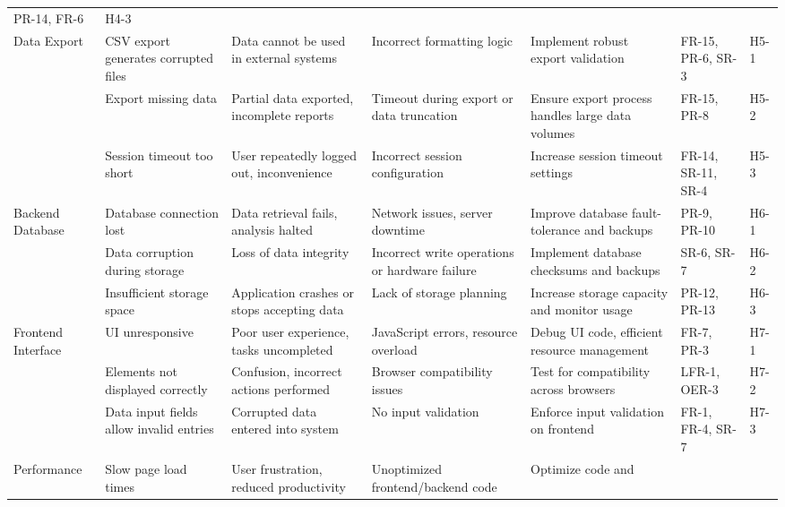 \documentclass{article}
\begin{document}
\begin{landscape}
\begin{longtable}{|p{2.5cm}|p{4cm}|p{4cm}|p{4cm}|p{4cm}|p{1.25cm}|p{1cm}|}
        PR-14, FR-6 & H4-3 \\
        \cline{1-7}
        Data Export & CSV export generates corrupted files & Data cannot be used
        in external systems & Incorrect formatting logic & Implement robust
        export validation & FR-15, PR-6, SR-3 & H5-1 \\
        \cline{2-7}
        \texttt{} & Export missing data & Partial data exported, incomplete
        reports & Timeout during export or data truncation & Ensure export
        process handles large data volumes & FR-15, PR-8 & H5-2 \\
        \cline{2-7}
        \texttt{} & Session timeout too short & User repeatedly logged out,
        inconvenience & Incorrect session configuration & Increase session
        timeout settings & FR-14, SR-11, SR-4 & H5-3 \\
        \cline{1-7}
        Backend Database & Database connection lost & Data retrieval fails,
        analysis halted & Network issues, server downtime & Improve database
        fault-tolerance and backups & PR-9, PR-10 & H6-1 \\
        \cline{2-7}
        \texttt{} & Data corruption during storage & Loss of data integrity &
        Incorrect write operations or hardware failure & Implement database
        checksums and backups & SR-6, SR-7 & H6-2 \\
        \cline{2-7}
        \texttt{} & Insufficient storage space & Application crashes or stops
        accepting data & Lack of storage planning & Increase storage capacity
        and monitor usage & PR-12, PR-13 & H6-3 \\
        \cline{1-7}
        Frontend Interface & UI unresponsive & Poor user experience, tasks
        uncompleted & JavaScript errors, resource overload & Debug UI code,
        efficient resource management & FR-7, PR-3 & H7-1 \\
        \cline{2-7}
        \texttt{} & Elements not displayed correctly & Confusion, incorrect
        actions performed & Browser compatibility issues & Test for
        compatibility across browsers & LFR-1, OER-3 & H7-2 \\
        \cline{2-7}
        \texttt{} & Data input fields allow invalid entries & Corrupted data
        entered into system & No input validation & Enforce input validation on
        frontend & FR-1, FR-4, SR-7 & H7-3 \\
        \cline{1-7}
        Performance & Slow page load times & User frustration, reduced
        productivity & Unoptimized frontend/backend code & Optimize code and

\end{longtable}
\end{landscape}
\end{document}
